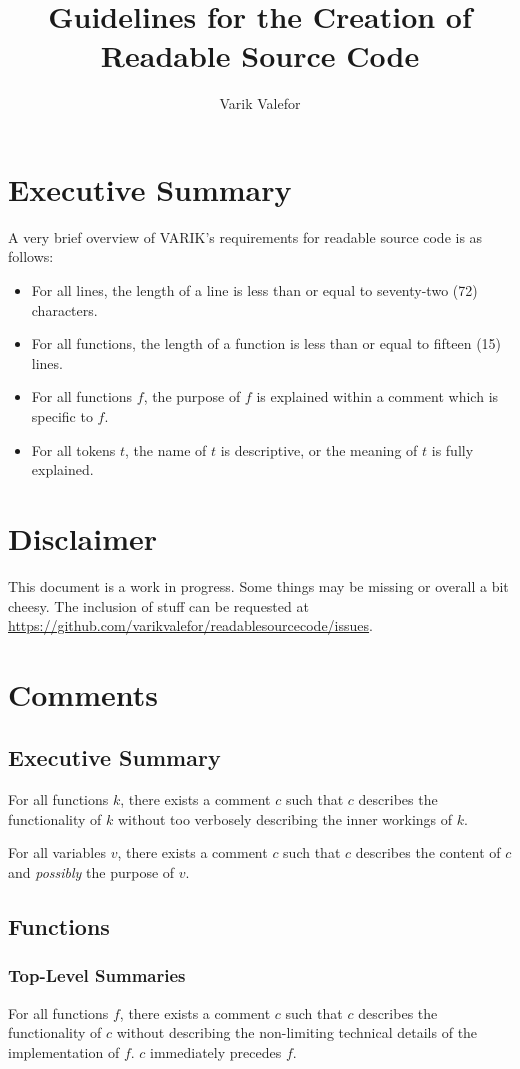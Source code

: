 \documentclass{report}
\title{Guidelines for the Creation of Readable Source Code}
\author{Varik Valefor}
\begin{document}
\maketitle{}
\tableofcontents{}
\chapter{Executive Summary}
	A very brief overview of VARIK's requirements for readable source code is as follows:
	\begin{itemize}
		\item For all lines, the length of a line is less than or equal to seventy-two (72) characters.
		\item For all functions, the length of a function is less than or equal to fifteen (15) lines.
		\item For all functions $f$, the purpose of $f$ is explained within a comment which is specific to $f$.
		\item For all tokens $t$, the name of $t$ is descriptive, or the meaning of $t$ is fully explained.
	\end{itemize}
\chapter{Disclaimer}
This document is a work in progress.  Some things may be missing or overall a bit cheesy.  The inclusion of stuff can be requested at \url{https://github.com/varikvalefor/readablesourcecode/issues}.
\chapter{Comments}
\section{Executive Summary}
For all functions $k$, there exists a comment $c$ such that $c$ describes the functionality of $k$ without too verbosely describing the inner workings of $k$.

For all variables $v$, there exists a comment $c$ such that $c$ describes the content of $c$ and \textit{possibly} the purpose of $v$.

\section{Functions}
\subsection{Top-Level Summaries}
For all functions $f$, there exists a comment $c$ such that $c$ describes the functionality of $c$ without describing the non-limiting technical details of the implementation of $f$.  $c$ immediately precedes $f$.
\end{document}

